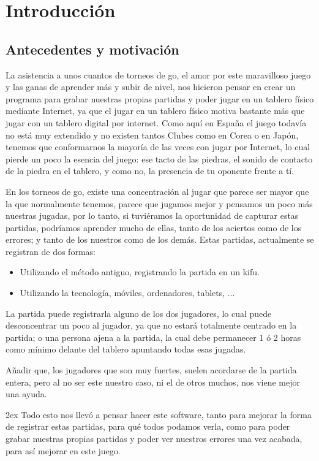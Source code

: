 \documentclass[12pt,a4papert,woside,openright,titlepage,final]{book}
\begin{document}
\chapter{Introducción}

\section{Antecedentes y motivación}

La asistencia a unos cuantos de torneos de go, el amor por este maravilloso
juego y las ganas de aprender más y subir de nivel, nos hicieron pensar en crear
un programa para grabar nuestras propias partidas y poder jugar en un tablero
físico mediante Internet, ya que el jugar en un tablero físico motiva bastante
más que jugar con un tablero digital por internet. Como aquí en España el juego todavía no está muy
extendido y no existen tantos Clubes como en Corea o en Japón, tenemos que
conformarnos la mayoría de las veces con jugar por Internet, lo cual pierde un
poco la esencia del juego: ese tacto de las piedras, el sonido de contacto de la
piedra en el tablero, y como no, la presencia de tu oponente frente a tí.

En los torneos de go, existe una concentración al jugar que parece ser mayor que
la que normalmente tenemos, parece que jugamos mejor y pensamos un poco más nuestras
jugadas, por lo tanto, si tuviéramos la oportunidad de capturar estas partidas,
podríamos aprender mucho de ellas, tanto de los aciertos como de los errores; y
tanto de los nuestros como de los demás. 
Estas partidas, actualmente se registran de dos formas: 
\begin{itemize}
    \item Utilizando el método antiguo, registrando la partida en un kifu. 
    \item Utilizando la tecnología, móviles, ordenadores, tablets, ...
\end{itemize} 

La partida puede registrarla alguno de los dos jugadores, lo cual puede
desconcentrar un poco al jugador, ya que no estará totalmente centrado en la
partida; o una persona ajena a la partida, la cual debe permanecer 1 ó 2 horas
como mínimo delante del tablero apuntando todas esas jugadas. 

Añadir que, los jugadores que son muy fuertes, suelen acordarse de la
partida entera, pero al no ser este nuestro caso, ni el de otros muchos, nos
viene mejor una ayuda. 

\parskip 2ex
Todo esto nos llevó a pensar hacer este software, tanto para mejorar la forma de
registrar estas partidas, para qué todos podamos verla, como para poder grabar
nuestras propias partidas y poder ver nuestros errores una vez acabada, para así
mejorar en este juego. 
\end{document}
